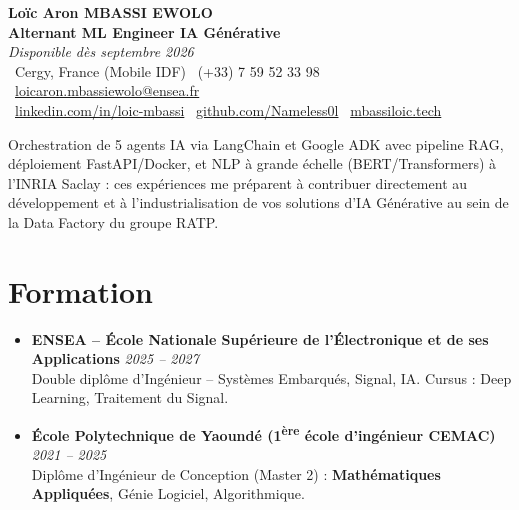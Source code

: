 \documentclass[a4paper,11pt]{article}
\begin{document}
\begin{center}
    {\Large \textbf{Loïc Aron MBASSI EWOLO}} \\ \vspace{4pt}
    \textbf{\large Alternant ML Engineer IA Générative} \\
    \textit{\small Disponible dès septembre 2026} \\ \vspace{4pt}
    \small
    \faMapMarker\ Cergy, France (Mobile IDF) \quad
    \faPhone\ (+33) 7 59 52 33 98 \quad
    \faEnvelope\ \href{mailto:loicaron.mbassiewolo@ensea.fr}{loicaron.mbassiewolo@ensea.fr} \\ \vspace{2pt}
    \faLinkedin\ \href{https://www.linkedin.com/in/loic-mbassi/}{linkedin.com/in/loic-mbassi} \quad
    \faGithub\ \href{https://github.com/Nameless0l}{github.com/Nameless0l} \quad
    \faGlobe\ \href{https://mbassiloic.tech}{mbassiloic.tech}
\end{center}

\vspace{-6pt}

\noindent\small{Orchestration de 5 agents IA via LangChain et Google ADK avec pipeline RAG, déploiement FastAPI/Docker, et NLP à grande échelle (BERT/Transformers) à l'INRIA Saclay : ces expériences me préparent à contribuer directement au développement et à l'industrialisation de vos solutions d'IA Générative au sein de la Data Factory du groupe RATP.}

\section{Formation}
\begin{itemize}[leftmargin=*, label=\tiny$\bullet$, nosep]
    \item \textbf{ENSEA -- École Nationale Supérieure de l'Électronique et de ses Applications} \hfill \textit{2025 -- 2027} \\
    \small{Double diplôme d'Ingénieur -- Systèmes Embarqués, Signal, IA. Cursus : Deep Learning, Traitement du Signal.}
    \item \textbf{École Polytechnique de Yaoundé (1\textsuperscript{ère} école d'ingénieur CEMAC)} \hfill \textit{2021 -- 2025} \\
    \small{Diplôme d'Ingénieur de Conception (Master 2) : \textbf{Mathématiques Appliquées}, Génie Logiciel, Algorithmique.}
\end{itemize}
\end{document}
